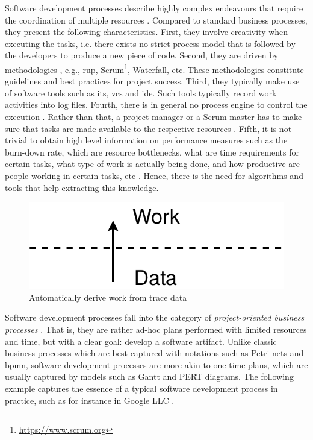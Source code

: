 Software development processes describe highly complex endeavours that require the coordination of multiple resources \citep{Kraut1995,Crowston2005}. Compared to standard business processes, they present the following characteristics. First, 
they involve creativity \citep{DeLaBarra2013,DBLP:journals/corr/abs-1305-6045,DBLP:journals/jss/AldaveVGM19} when executing the tasks, i.e. there exists no strict process model that is followed by the developers to produce a new piece of code. Second, they are driven by methodologies \citep{Wynekoop1997}, e.g., \gls{rup}, Scrum\footnote{\url{https://www.scrum.org}}, Waterfall, etc. These methodologies constitute guidelines and best practices for project success. Third, they typically make use of software tools \citep{DBLP:books/daglib/0022944} such as \gls{its}, \gls{vcs} and \gls{ide}. Such tools typically record work activities into log files. Fourth, there is in general no process engine to control the execution \citep{Zahran1998}. Rather than that, a project manager or a Scrum master has to make sure that tasks are made available to the respective resources \citep{DBLP:books/daglib/0014800}. Fifth, it is not trivial to obtain high level information on performance measures such as the burn-down rate, which are resource bottlenecks, what are time requirements for certain tasks, what type of work is actually being done, and how productive are people working in certain tasks, etc \citep{DBLP:journals/csur/MeidanGRE18}. Hence, there is the need for algorithms and tools that help extracting this knowledge.

\begin{figure}
	\centering
	\includegraphics[width=0.4\linewidth]{figures/data-to-work}
	\caption{Automatically derive work from trace data}
	\label{fig:data-to-work}
\end{figure}


Software development processes fall into the category of \emph{project-oriented business processes} \citep{DBLP:conf/bpm/BalaCMRP15}. 
That is, they are rather ad-hoc plans performed with limited resources and time, but with a clear goal: develop a software artifact. Unlike classic business processes which are best captured with notations such as Petri nets and \gls{bpmn}, software development processes are more akin to one-time plans, which are usually captured by models such as Gantt and PERT diagrams. The following example captures the essence of a typical software development process in practice, such as for instance in Google LLC \citep{Henderson2017}.


